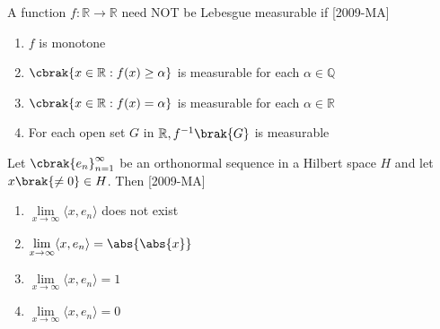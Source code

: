 \item A function $f:\mathbb R \rightarrow \mathbb R$ need NOT be Lebesgue measurable if \hfill{[2009-MA]}
\begin{enumerate}
    \item $f$ is monotone
    \item $\cbrak{x \in \mathbb R:f(x) \geq \alpha}$ is measurable for each $\alpha \in \mathbb Q$
    \item $\cbrak{x \in \mathbb R:f(x) = \alpha}$ is measurable for each $\alpha \in \mathbb R$
    \item For each open set $G$ in $\mathbb R, f^{-1}\brak{G}$ is measurable
\end{enumerate}

\item Let $\cbrak{e_n}_{n=1}^\infty$ be an orthonormal sequence in a Hilbert space $H$ and let $x\brak{\neq 0} \in H$. Then \hfill{[2009-MA]}
\begin{enumerate}
    \item $\lim\limits_{x\to \infty} \langle x, e_n \rangle $ does not exist
    \item $\lim\limits_{x\to \infty} \langle x, e_n \rangle =\abs{\abs{x}}$
    \item $\lim\limits_{x\to \infty} \langle x, e_n \rangle =1$
    \item $\lim\limits_{x\to \infty} \langle x, e_n \rangle =0$
\end{enumerate}
